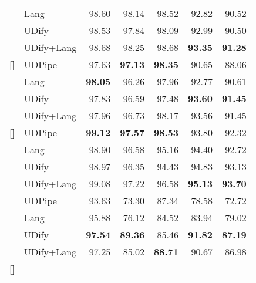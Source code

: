 \documentclass[11pt,a4paper]{article}
\begin{document}
\begin{table}[!t]
\begin{center}
\begin{tabularx}{\linewidth}{@{}Xlrrrrr@{}}
    \addlinespace[2pt]
        & Lang       &      98.60 &      98.14 &      98.52 &      92.82 &      90.52 \\
        & UDify      &      98.53 &      97.84 &      98.09 &      92.99 &      90.50 \\
        & UDify+Lang &      98.68 &      98.25 &      98.68 &  \bf 93.35 &  \bf 91.28 \\
    \addlinespace[5pt]
    [\normalbaselineskip]{}
        & UDPipe     &      97.63 &  \bf 97.13 &  \bf 98.35 &      90.65 &      88.06 \\
    \addlinespace[2pt]
        & Lang       &  \bf 98.05 &      96.26 &      97.96 &      92.77 &      90.61 \\
        & UDify      &      97.83 &      96.59 &      97.48 &  \bf 93.60 &  \bf 91.45 \\
        & UDify+Lang &      97.96 &      96.73 &      98.17 &      93.56 &      91.45 \\
    \addlinespace[5pt]
    [\normalbaselineskip]{\vspace{-10pt} }
        & UDPipe     &  \bf 99.12 &  \bf 97.57 &  \bf 98.53 &      93.80 &      92.32 \\
    \addlinespace[2pt]
        & Lang       &      98.90 &      96.58 &      95.16 &      94.40 &      92.72 \\
        & UDify      &      98.97 &      96.35 &      94.43 &      94.83 &      93.13 \\
        & UDify+Lang &      99.08 &      97.22 &      96.58 &  \bf 95.13 &  \bf 93.70 \\
    \midrule
    [\normalbaselineskip]{}
        & UDPipe     &      93.63 &      73.30 &      87.34 &      78.58 &      72.72 \\
    \addlinespace[2pt]
        & Lang       &      95.88 &      76.12 &      84.52 &      83.94 &      79.02 \\
        & UDify      &  \bf 97.54 &  \bf 89.36 &      85.46 &  \bf 91.82 &  \bf 87.19 \\
        & UDify+Lang &      97.25 &      85.02 &  \bf 88.71 &      90.67 &      86.98 \\
    \addlinespace[5pt]
    [\normalbaselineskip]{}

\end{tabularx}
\end{center}
\end{table}
\end{document}
